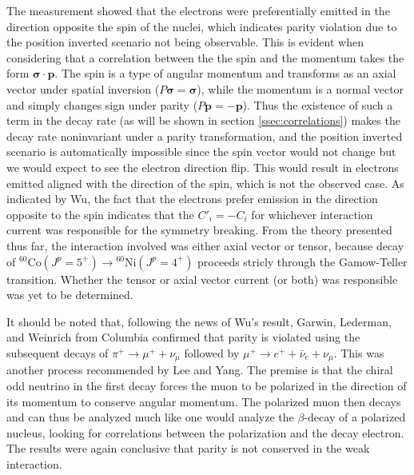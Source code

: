 The measurement showed that the electrons were preferentially
emitted in the direction opposite the spin of the nuclei, which indicates parity violation due to
the position inverted scenario not being observable. This is evident when considering that
a correlation between the the spin and the momentum takes the form $\boldsymbol{\sigma \cdot p}$.
The spin is a type of angular momentum and transforms as an axial vector under spatial inversion
($P\boldsymbol{\sigma}=\boldsymbol{\sigma}$), while the momentum is a normal vector and
simply changes sign under parity ($P\boldsymbol{p}=-\boldsymbol{p}$). Thus the existence of
such a term in the decay rate (as will be shown in section \ref{ssec:correlations}) makes the
decay rate noninvariant under a parity transformation, and the position inverted scenario
is automatically impossible since the spin vector would not change but we would expect to see
the electron direction flip. This would result in electrons emitted aligned with the direction
of the spin, which is not the observed case. As indicated by Wu,
the fact that the electrons prefer emission in the direction opposite
to the spin indicates that the $C'_i=-C_i$ for whichever
interaction current was responsible for the symmetry breaking. From the theory presented thus far,
the interaction involved was either axial vector or tensor, because decay of
$^{60}\mathrm{Co} (J^p=5^+) \rightarrow {^{60}\mathrm{Ni}}(J^p=4^+)$ proceeds stricly through
the Gamow-Teller transition. Whether the tensor or axial vector current (or both) was responsible
was yet to be determined.

It should be noted that, following the news of Wu's result, Garwin, Lederman, and
Weinrich \cite{garwin1957} from Columbia confirmed
that parity is violated using the subsequent decays of $\pi^+ \rightarrow \mu^++\nu_\mu$
followed by $\mu^+ \rightarrow e^+ + \bar{\nu}_e + \nu_\mu$. This was another process
recommended by Lee and Yang. The premise is that the chiral odd neutrino in the first decay
forces the muon to be polarized in the direction of its momentum to conserve angular
momentum. The polarized muon then decays and can thus be analyzed much like one would analyze the
$\beta$-decay of a polarized nucleus, looking for correlations between the polarization and
the decay electron. The results were again conclusive that parity is not conserved in the weak
interaction.

